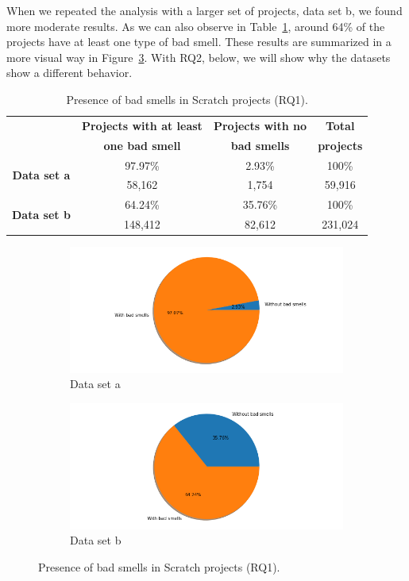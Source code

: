 When we repeated the analysis with a larger set of projects, data set b, we found more moderate results. As we can also observe in Table~\ref{table:result_rq1}, around 64\% of the projects have at least one type of bad smell. These results are summarized in a more visual way in Figure~\ref{fig:rq1_result}. With RQ2, below, we will show why the datasets show a different behavior.

\begin{table}
 \begin{center}
  \begin{tabular}{|c|c|c|c|}
    \hline
     & \textbf{Projects with at least} & \textbf{Projects with no} & \textbf{Total} \\ 
     & \textbf{one bad smell} & \textbf{bad smells} & \textbf{projects} \\ \hline
     \multirow{2}{*}{\textbf{Data set a}} & 97.97\% & 2.93\% & 100\% \\ 
     & 58,162 & 1,754 & 59,916 \\
     \hline
    \multirow{2}{*}{\textbf{Data set b}} & 64.24\% & 35.76\% & 100\% \\ 
     & 148,412 & 82,612 & 231,024 \\ \hline
  \end{tabular}
  \caption{Presence of bad smells in Scratch projects (RQ1).}
  \label{table:result_rq1}
 \end{center}
\end{table}

\begin{figure}
  \begin{subfigure}{.5\textwidth}
    \centering
    \includegraphics[width=11cm]{img/rq1_dataset_a.png}
    \caption{Data set a}
    \label{subfig:rq1_results_a}
  \end{subfigure}
  \begin{subfigure}{.5\textwidth}
    \centering
    \includegraphics[width=11cm]{img/rq1_dataset_b.png}
    \caption{Data set b}
    \label{subfig:rq1_results_b}
  \end{subfigure}
  \caption{Presence of bad smells in Scratch projects (RQ1).}
  \label{fig:rq1_result}
\end{figure}  

